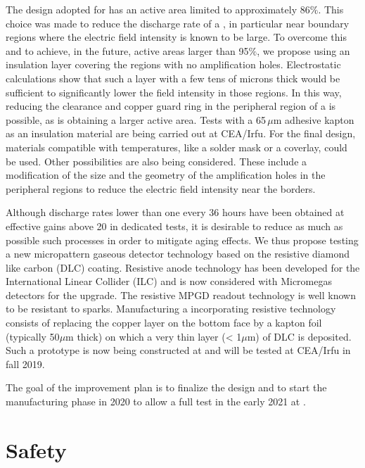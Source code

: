 The  design adopted for  has an active area limited to approximately 86$\%$. This choice was made to reduce the discharge rate of a , in particular near boundary regions where the electric field intensity is known to be large. To overcome this and to achieve, in the future, active areas larger than 95$\%$, we propose using an insulation layer covering the regions with no amplification holes. Electrostatic calculations show that such a layer with a few tens of microns thick would be sufficient to significantly lower the field intensity in those regions. In this way, reducing the \frfour clearance and copper guard ring in the peripheral region of a  is possible, as is obtaining a larger active area. Tests with a 65\,$\mu$m adhesive kapton as an insulation material are being carried out at CEA/Irfu. For the final  design, materials compatible with  temperatures, like a solder mask or a coverlay, could be used. Other possibilities are also being considered. These include a modification of the size and the geometry of the amplification holes in the peripheral regions to reduce the electric field intensity near the  borders.

Although  discharge rates lower than one every \num{36} hours have been obtained at effective gains above \num{20} in dedicated \coldbox tests, it is desirable to reduce as much as possible such processes in order to mitigate aging effects. We thus propose testing a new micropattern gaseous detector technology based on the resistive diamond like carbon (DLC) coating. Resistive anode technology has been developed for the International Linear Collider (ILC)  and is now considered with Micromegas detectors for the   upgrade. The resistive MPGD readout technology is well known to be resistant to sparks. Manufacturing a  incorporating resistive technology consists of replacing the copper layer on the bottom face by a kapton foil (typically 50$\mu$m thick) on which a very thin layer (< 1$\mu$m) of DLC is deposited. Such a  prototype is now being constructed at  and will be tested at CEA/Irfu in fall 2019. 

The goal of the  improvement plan is to finalize the  design and to start the manufacturing phase in 2020 to allow a full  test in the \coldbox early 2021 at .

\section{Safety}
\label{sec:dp-crp-safety}

